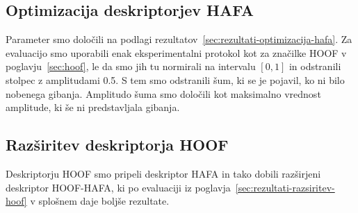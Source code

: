\subsection{Optimizacija deskriptorjev HAFA}
Parameter \nhafa smo določili na podlagi rezultatov~\ref{sec:rezultati-optimizacija-hafa}. Za evaluacijo smo uporabili enak eksperimentalni protokol kot za značilke HOOF v poglavju~\ref{sec:hoof}, le da smo jih tu normirali na intervalu $[0, 1]$ in odstranili stolpec z amplitudami \num{0.5}. S tem smo odstranili šum, ki se je pojavil, ko ni bilo nobenega gibanja. Amplitudo šuma smo določili kot maksimalno vrednost amplitude, ki še ni predstavljala gibanja. %

\subsection{Razširitev deskriptorja HOOF}\label{sec:razsiritev-hoof-rezultati}
Deskriptorju HOOF smo pripeli deskriptor HAFA in tako dobili razširjeni deskriptor HOOF-HAFA, ki po evaluaciji iz poglavja~\ref{sec:rezultati-razsiritev-hoof} v splošnem daje boljše rezultate.

